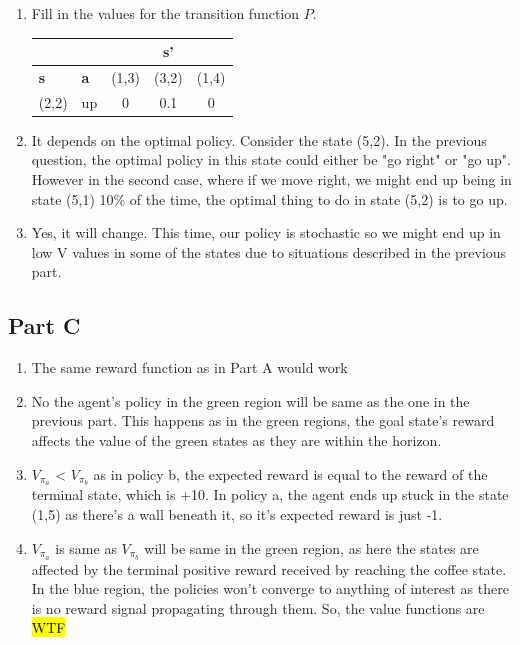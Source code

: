 \documentclass{article}
\begin{document}
\begin{enumerate}[label=(\alph*)]
\item Fill in the values for the transition function $P$.\\
    \begin{center}
    \begin{tabular}{|l|l|c|c|c|}\hline
      \multicolumn{2}{|c|}{} &
                               \multicolumn{3}{|c|}{\textbf{s'}}\\\hline
      \textbf{s} & \textbf{a} & (1,3) & (3,2) & (1,4)\\\hline
      (2,2) & up & 0 & 0.1 & 0 \\ \hline
    \end{tabular}
  \end{center}

\item It depends on the optimal policy. Consider the state (5,2). In the previous question, the optimal policy in this state could either be "go right" or "go up". However in the second case, where if we move right, we might end up being in state (5,1) 10\% of the time, the optimal thing to do in state (5,2) is to go up.  
  
\item Yes, it will change. This time, our policy is stochastic so we might end up in low V values in some of the states due to situations described in the previous part.
\end{enumerate}

\subsection{Part C}

\begin{enumerate}[label=(\alph*)]
\item The same reward function as in Part A would work

\item No the agent's policy in the green region will be same as the one in the previous part. This happens as in the green regions, the goal state's reward affects the value of the green states as they are within the horizon. 
  
\item $V_{\pi_a}$ < $V_{\pi_b}$ as in policy b, the expected reward is equal to the reward of the terminal state, which is +10. In policy a, the agent ends up stuck in the state (1,5) as there's a wall beneath it, so it's expected reward is just -1.

\item $V_{\pi_a}$ is same as $V_{\pi_b}$ will be same in the green region, as here the states are affected by the terminal positive reward received by reaching the coffee state. In the blue region, the policies won't converge to anything of interest as there is no reward signal propagating through them. So, the value functions are \hl{WTF} 

\end{enumerate}
\end{document}
